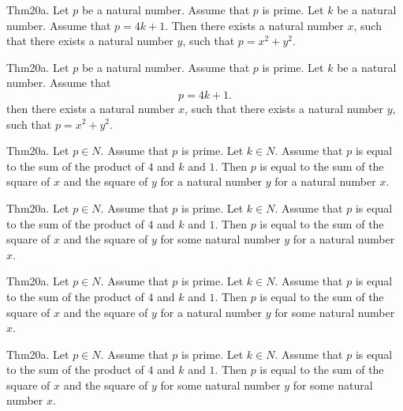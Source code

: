 \documentclass{article}
\begin{document}
Thm20a. Let $p$ be a natural number. Assume that $p$ is prime. Let $k$ be a natural number. Assume that $p = 4 k + 1$. Then there exists a natural number $x$, such that there exists a natural number $y$, such that $p = x ^{ 2}+ y ^{ 2}$.

Thm20a. Let $p$ be a natural number. Assume that $p$ is prime. Let $k$ be a natural number. Assume that $$p = 4 k + 1.$$ then there exists a natural number $x$, such that there exists a natural number $y$, such that $p = x ^{ 2}+ y ^{ 2}$.

Thm20a. Let $p \in N$. Assume that $p$ is prime. Let $k \in N$. Assume that $p$ is equal to the sum of the product of $4$ and $k$ and $1$. Then $p$ is equal to the sum of the square of $x$ and the square of $y$ for a natural number $y$ for a natural number $x$.

Thm20a. Let $p \in N$. Assume that $p$ is prime. Let $k \in N$. Assume that $p$ is equal to the sum of the product of $4$ and $k$ and $1$. Then $p$ is equal to the sum of the square of $x$ and the square of $y$ for some natural number $y$ for a natural number $x$.

Thm20a. Let $p \in N$. Assume that $p$ is prime. Let $k \in N$. Assume that $p$ is equal to the sum of the product of $4$ and $k$ and $1$. Then $p$ is equal to the sum of the square of $x$ and the square of $y$ for a natural number $y$ for some natural number $x$.

Thm20a. Let $p \in N$. Assume that $p$ is prime. Let $k \in N$. Assume that $p$ is equal to the sum of the product of $4$ and $k$ and $1$. Then $p$ is equal to the sum of the square of $x$ and the square of $y$ for some natural number $y$ for some natural number $x$.
\end{document}
